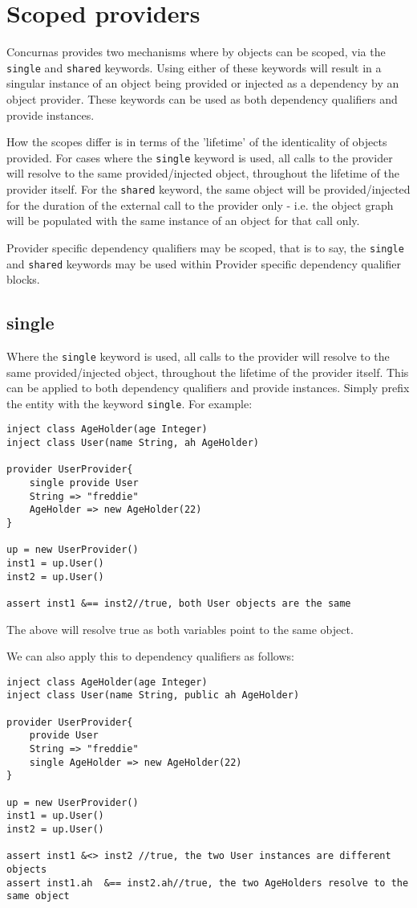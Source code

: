 \documentclass[conc-doc]{subfiles}
\begin{document}
\section{Scoped providers}
Concurnas provides two mechanisms where by objects can be scoped, via the \lstinline{single} and \lstinline{shared} keywords. Using either of these keywords will result in a singular instance of an object being provided or injected as a dependency by an object provider. These keywords can be used as both dependency qualifiers and provide instances.

How the scopes differ is in terms of the 'lifetime' of the identicality of objects provided. For cases where the \lstinline{single} keyword is used, all calls to the provider will resolve to the same provided/injected object, throughout the lifetime of the provider itself. For the \lstinline{shared} keyword, the same object will be provided/injected for the duration of the external call to the provider only - i.e. the object graph will be populated with the same instance of an object for that call only.

Provider specific dependency qualifiers may be scoped, that is to say, the \lstinline{single} and \lstinline{shared} keywords may be used within Provider specific dependency qualifier blocks.

\subsection{single}
Where the \lstinline{single} keyword is used, all calls to the provider will resolve to the same provided/injected object, throughout the lifetime of the provider itself. This can be applied to both dependency qualifiers and provide instances. Simply prefix the entity with the keyword \lstinline{single}. For example:

\begin{lstlisting}
inject class AgeHolder(age Integer)
inject class User(name String, ah AgeHolder)

provider UserProvider{
	single provide User
	String => "freddie"
	AgeHolder => new AgeHolder(22)
}

up = new UserProvider()
inst1 = up.User()
inst2 = up.User()

assert inst1 &== inst2//true, both User objects are the same
\end{lstlisting}

The above will resolve true as both variables point to the same object.

We can also apply this to dependency qualifiers as follows:
\begin{lstlisting}
inject class AgeHolder(age Integer)
inject class User(name String, public ah AgeHolder)

provider UserProvider{
	provide User
	String => "freddie"
	single AgeHolder => new AgeHolder(22)
}

up = new UserProvider()
inst1 = up.User()
inst2 = up.User()

assert inst1 &<> inst2 //true, the two User instances are different objects
assert inst1.ah  &== inst2.ah//true, the two AgeHolders resolve to the same object
\end{lstlisting}
\end{document}
